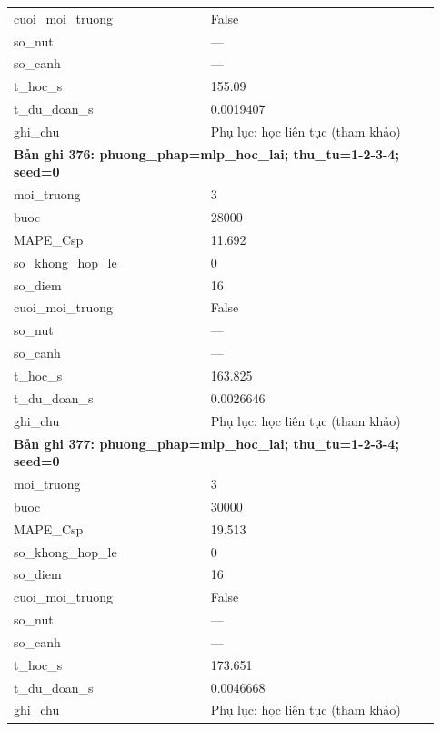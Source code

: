 \begin{longtable}{p{0.43\linewidth}p{0.50\linewidth}}
cuoi\_\allowbreak moi\_\allowbreak truong & False \\
so\_\allowbreak nut & — \\
so\_\allowbreak canh & — \\
t\_\allowbreak hoc\_\allowbreak s & 155.09 \\
t\_\allowbreak du\_\allowbreak doan\_\allowbreak s & 0.0019407 \\
ghi\_\allowbreak chu & Phụ lục: học liên tục (tham khảo) \\
\midrule
\multicolumn{2}{p{0.95\linewidth}}{\textbf{Bản ghi 376: phuong\_phap=mlp\_hoc\_lai; thu\_tu=1-2-3-4; seed=0}} \\
moi\_\allowbreak truong & 3 \\
buoc & 28000 \\
MAPE\_\allowbreak Csp & 11.692 \\
so\_\allowbreak khong\_\allowbreak hop\_\allowbreak le & 0 \\
so\_\allowbreak diem & 16 \\
cuoi\_\allowbreak moi\_\allowbreak truong & False \\
so\_\allowbreak nut & — \\
so\_\allowbreak canh & — \\
t\_\allowbreak hoc\_\allowbreak s & 163.825 \\
t\_\allowbreak du\_\allowbreak doan\_\allowbreak s & 0.0026646 \\
ghi\_\allowbreak chu & Phụ lục: học liên tục (tham khảo) \\
\midrule
\multicolumn{2}{p{0.95\linewidth}}{\textbf{Bản ghi 377: phuong\_phap=mlp\_hoc\_lai; thu\_tu=1-2-3-4; seed=0}} \\
moi\_\allowbreak truong & 3 \\
buoc & 30000 \\
MAPE\_\allowbreak Csp & 19.513 \\
so\_\allowbreak khong\_\allowbreak hop\_\allowbreak le & 0 \\
so\_\allowbreak diem & 16 \\
cuoi\_\allowbreak moi\_\allowbreak truong & False \\
so\_\allowbreak nut & — \\
so\_\allowbreak canh & — \\
t\_\allowbreak hoc\_\allowbreak s & 173.651 \\
t\_\allowbreak du\_\allowbreak doan\_\allowbreak s & 0.0046668 \\
ghi\_\allowbreak chu & Phụ lục: học liên tục (tham khảo) \\

\end{longtable}
